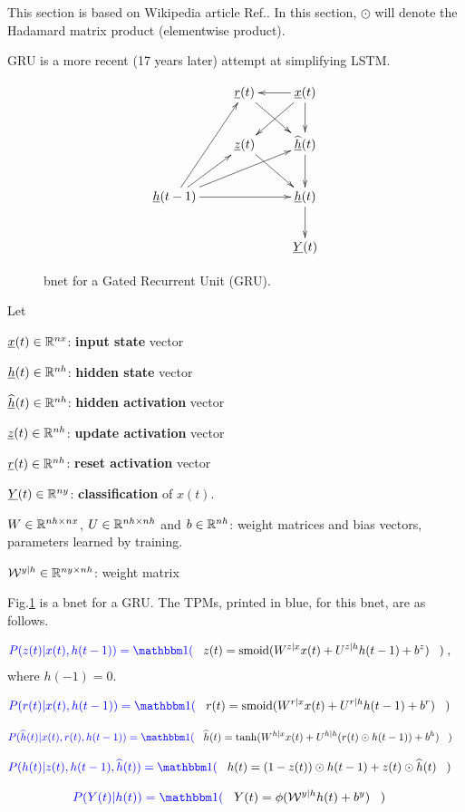 This 
section is based 
on Wikipedia article Ref.\cite{gru}. In this section,
$\odot$
will denote the Hadamard matrix product
(elementwise product).

GRU is a more recent (17 years later)
attempt at simplifying LSTM.

\begin{figure}[h!]
\centering
$$\xymatrix{
&\rvr(t)\ar[dr]&\rvx(t)\ar[d]\ar[dl]\ar[l]
\\
&\rvz(t)\ar[dr]
&\HAT{\rvh}(t)\ar[d]
\\
\rvh(t-1)\ar[ur]\ar[rr]\ar[urr]\ar[uur]
&&\rvh(t)\ar[d]
\\
&&\rvY(t)
}$$
\caption{bnet for a Gated
Recurrent Unit (GRU).}
\label{fig-rnn-gru}
\end{figure}

Let

$\rvx(t)\in \RR^{nx}$: {\bf input state} vector

$\rvh(t)\in\RR^{nh}$: {\bf hidden state} vector

$\HAT{\rvh}(t)\in\RR^{nh}$: {\bf hidden activation} vector

$\rvz(t)\in\RR^{nh}$: {\bf update activation} vector

$\rvr(t)\in\RR^{nh}$: {\bf reset activation} vector

$\rvY(t)\in \RR^{ny}$:
{\bf classification} of $x(t)$.

$W\in { \mathbb{R}}^{nh\times nx}$,
$U\in { \mathbb{R}}^{nh\times nh}$
and 
$b\in { \mathbb{R}}^{nh}$:
weight matrices and bias vectors,
 parameters learned by training.

${\cal W}^{y|h}\in { \mathbb{R}}^{ny\times nh}$:
 weight matrix

Fig.\ref{fig-rnn-gru}
is a bnet
for a GRU.
The TPMs, printed in blue,
for this bnet, are
as follows.


\begin{align}\color{blue}
P(z(t)|x(t),h(t-1))=\indi(\;\;\;&
z(t) = \smoid(W^{z|x} x(t) + U^{z|h} h(t-1) + b^z)
\;\;\;)
\;,
\end{align}
where $h(-1)=0$.

\begin{align}\color{blue}
P(r(t)|x(t), h(t-1))=\indi(\;\;\;&
r(t) = \smoid(W^{r|x} x(t) + U^{r|h} h(t-1) + b^r)
\;\;\;)
\end{align}

\begin{align}\color{blue}
P(\HAT{h}(t)|x(t), r(t), h(t-1))=
\indi(\;\;\;&
\HAT{h}(t) = \tanh(W^{h|x} x(t) +
 U^{h|h} (r(t) \odot h(t-1)) + b^h)
\;\;\;)
\end{align}

\begin{align}\color{blue}
P(h(t)|z(t), h(t-1),\HAT{h}(t))=\indi(\;\;\;&
h(t) =  (1 - z(t)) \odot h(t-1) +
 z(t) \odot \HAT{h}(t)
\;\;\;)
\end{align}

\begin{align}\color{blue}
P(Y(t)|h(t))=\indi(\;\;\;&
Y(t)= \phi(\calw^{y|h}h(t) + b^y)\;\;\;)
\end{align}